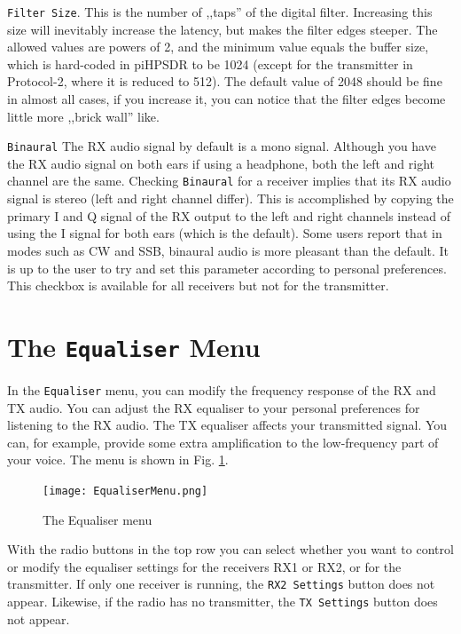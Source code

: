 \documentclass[12pt]{book}
\def\rett#1{\texttt{\color{red}#1}}
\def\bltt#1{\texttt{\color{blue}#1}}
\def\pH{pi\-HPSDR\xspace}
\begin{document}
\rett{Filter Size}. This is the number of ,,taps'' of the digital
filter. Increasing this size will inevitably increase the latency,
but makes the filter edges steeper. The allowed values are
powers of 2, and the minimum value equals the buffer size, which
is hard-coded in \pH to be 1024 (except for the transmitter in Protocol-2,
where it is reduced to 512). The default value of 2048 should be
fine in almost all cases, if you increase it, you can notice that
the filter edges become little more ,,brick wall'' like.

\rett{Binaural} The RX audio signal by default is a mono signal. Although
you have the RX audio signal on both ears if using a headphone, both the
left and right channel are the same. Checking \rett{Binaural} for a
receiver implies that its RX audio signal is stereo (left and right channel
differ). This is accomplished by copying the primary I and Q signal of the
RX output to the left and right channels instead of using the I signal
for both ears (which is the default). Some users report that in modes
such as CW and SSB, binaural audio is more pleasant than the default.
It is up to the user to try and set this parameter according to personal
preferences. This checkbox is available for all receivers but not for the
transmitter.

\section{The \texttt{Equaliser} Menu}
\label{sec:eqmenu}

In the \bltt{Equaliser} menu, you can modify the frequency response of
the RX and TX audio. You can adjust the RX equaliser to your personal
preferences for listening to the RX audio. The TX equaliser affects
your transmitted signal. You can, for example, provide some extra
amplification to the low-frequency part of your voice. The menu
is shown in Fig. \ref{fig:EqualiserMenu}.

\begin{figure}[ht]
\center
\texttt{[image: EqualiserMenu.png]}
\caption{The Equaliser menu}
\label{fig:EqualiserMenu}
\end{figure}

With the radio buttons in the top row you can select
whether you want to control or modify the equaliser settings for the receivers
RX1 or RX2, or for the transmitter. If only one receiver is running,
the \rett{RX2 Settings} button does not appear. Likewise, if the radio
has no transmitter, the \rett{TX Settings} button does not appear.
\end{document}
